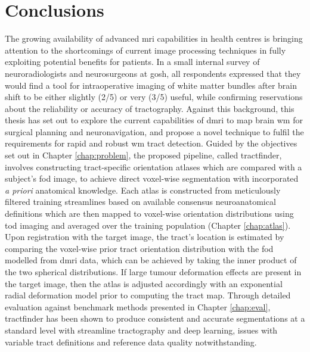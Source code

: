 \chapter{Conclusions}
\label{chapterlabel6}

The growing availability of advanced \gls{mri} capabilities in health centres is bringing attention to the shortcomings of current image processing techniques in fully exploiting potential benefits for patients.
In a small internal survey of neuroradiologists and neurosurgeons at \gls{gosh}, all respondents expressed that they would find a tool for intraoperative imaging of white matter bundles after brain shift to be either slightly (2/5) or very (3/5) useful, while confirming reservations about the reliability or accuracy of tractography.
Against this background, this thesis has set out to explore the current capabilities of \gls{dmri} to map brain \gls{wm} for surgical planning and neuronavigation, and propose a novel technique to fulfil the requirements for rapid and robust \gls{wm} tract detection.
Guided by the objectives set out in Chapter \ref{chap:problem}, the proposed pipeline, called tractfinder, involves constructing tract-specific orientation atlases which are compared with a subject's \gls{fod} image, to achieve direct voxel-wise segmentation with incorporated \textit{a priori} anatomical knowledge.
Each atlas is constructed from meticulously filtered training streamlines based on available consensus neuroanatomical definitions which are then mapped to voxel-wise orientation distributions using \gls{tod} imaging and averaged over the training population (Chapter \ref{chap:atlas}).
Upon registration with the target image, the tract's location is estimated by comparing the voxel-wise prior tract orientation distribution with the \gls{fod} modelled
from \gls{dmri} data, which can be achieved by taking the inner product of the two spherical distributions.
If large tumour deformation effects are present in the target image, then the atlas is adjusted accordingly with an exponential radial deformation model prior to computing the tract map.
Through detailed evaluation against benchmark methods presented in Chapter \ref{chap:eval}, tractfinder has been shown to produce consistent and accurate segmentations at a standard level with streamline tractography and deep learning, issues with variable tract definitions and reference data quality notwithstanding.

